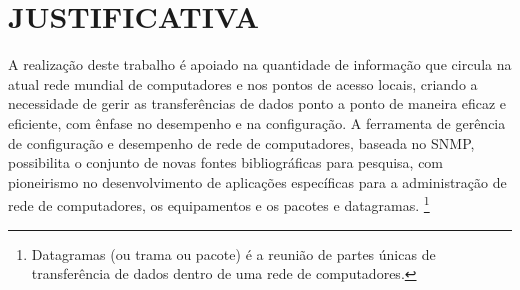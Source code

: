 \chapter{JUSTIFICATIVA}


\par A realização deste trabalho é apoiado na quantidade de informação que
circula na atual rede mundial de computadores e nos pontos de acesso locais,
criando a necessidade de gerir as transferências de dados ponto a ponto de
maneira eficaz e eficiente, com ênfase no desempenho e na configuração. A ferramenta de gerência de
configuração e desempenho de rede de computadores, baseada no SNMP, 
possibilita o conjunto de novas fontes bibliográficas para pesquisa, com pioneirismo no desenvolvimento de aplicações
específicas para a administração de rede de computadores, os equipamentos e os
pacotes e datagramas. \footnote{Datagramas (ou trama ou pacote) é a
reunião de partes únicas de transferência de dados dentro de uma rede de computadores.}




